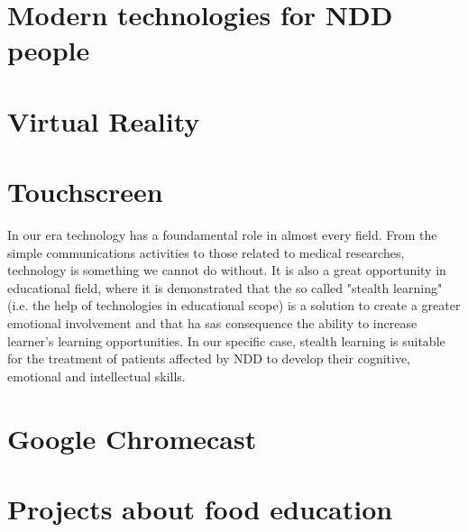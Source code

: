 \section{Modern technologies for NDD people}
\section{Virtual Reality}
\section{Touchscreen}
In our era technology has a foundamental role in almost every field. From the simple communications activities to those related to medical researches, technology is something we cannot do without. It is also a great opportunity in educational field, where it is demonstrated that the so called "stealth learning" (i.e. the help of technologies in educational scope) \cite{Sharp} is a solution to create a greater emotional involvement and that ha sas consequence the ability to increase learner's learning opportunities. In our specific case, stealth learning is suitable for the treatment of patients affected by NDD to develop their cognitive, emotional and intellectual skills.
\section{Google Chromecast}
\section{Projects about food education}

